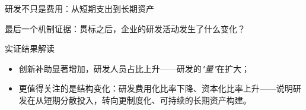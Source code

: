 \begin{frame}{研发不只是费用：从短期支出到长期资产}
  

  \vspace{0.3em}
  最后一个机制证据：贯标之后，企业的研发活动发生了什么变化？

  \begin{findingbox}{实证结果解读}
  \begin{itemize}
    \item 创新补助显著增加，研发人员占比上升——研发的\emph{"量"}在扩大；
    \item 更值得关注的是结构变化：研发费用化比率下降、资本化比率上升——说明研发在从短期分散投入，转向更制度化、可持续的长期资产构建。
  \end{itemize}
  \end{findingbox}
\end{frame}
